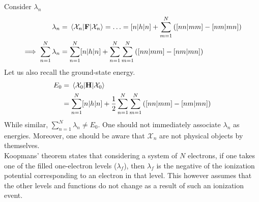 \documentclass[12pt,a4paper,titlepage]{article}
\newcommand{\Chi}{\mathcal{X}} %
\begin{document}
Consider $\lambda_{n}$
\begin{equation}
\begin{aligned}
\lambda_{n}&=\mel{\Chi_{n}}{\vb{F}}{\Chi_{n}}=\ldots=[n|h|n]+\sum_{m=1}^{N}\qty([nn|mm]-[nm|mn])\\
\implies \sum_{n=1}^{N}\lambda_{n}&=\sum_{n=1}^{N}[n|h|n]+\sum_{n=1}^{N}\sum_{m=1}^{N}\qty([nn|mm]-[nm|mn])
\end{aligned}
\end{equation}
Let us also recall the ground-state energy.
\begin{equation}
\begin{aligned}
E_{0}&=\mel{\Chi_{0}}{\vb{H}}{\Chi_{0}}\\
&=\sum_{n=1}^{N}[n|h|n]+\frac{1}{2}\sum_{n=1}^{N}\sum_{m=1}^{N}\qty([nn|mm]-[nm|mn])
\end{aligned}
\end{equation}
While similar, $\sum_{n=1}^{N}\lambda_{n}\neq E_{0}$. One should not immediately associate $\lambda_{n}$ as energies. Moreover, one should be aware that $\Chi_{n}$ are not physical objects by themselves.\\

Koopmans' theorem states that considering a system of $N$ electrons, if one takes one of the filled one-electron levels ($\lambda_{f}$), then $\lambda_{f}$ is the negative of the ionization potential corresponding to an electron in that level. This however assumes that the other levels and functions do not change as a result of such an ionization event.
\begin{center}
\end{center}
\end{document}
